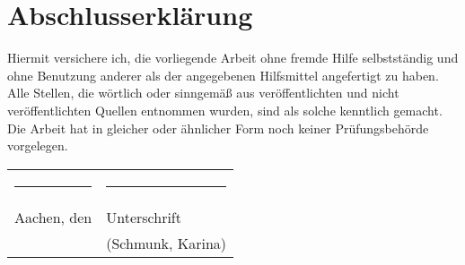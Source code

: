 \chapter*{Abschlusserklärung}

Hiermit versichere ich, die vorliegende Arbeit ohne fremde Hilfe selbstständig und ohne Benutzung anderer als der angegebenen Hilfsmittel angefertigt zu haben. Alle Stellen, die wörtlich oder sinngemäß aus veröffentlichten und nicht veröffentlichten Quellen entnommen wurden, sind als solche kenntlich gemacht. Die Arbeit hat in gleicher oder ähnlicher Form noch keiner Prüfungsbehörde vorgelegen.
\\[3\normalbaselineskip]
\begin{tabular}{p{} l}
  \rule{\textwidth/3}{0.4pt}   &   \rule{\textwidth/3}{0.4pt} \\
  Aachen, den                  &   Unterschrift
  \\
                               &   (Schmunk, Karina)
\end{tabular}
